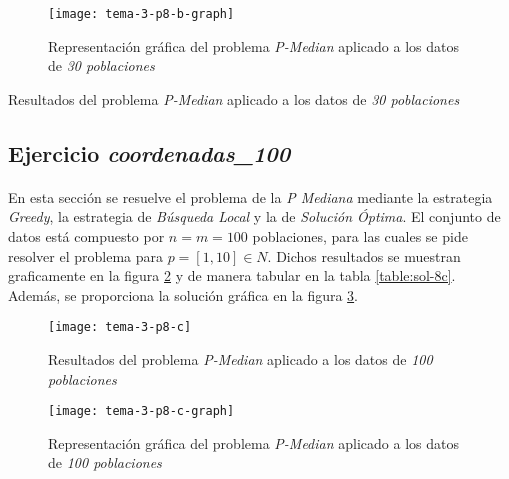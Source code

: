 \documentclass[spanish]{article}
\begin{document}
			\begin{figure}[h]
				\begin{center}
					\texttt{[image: tema-3-p8-b-graph]}
				\end{center}
				\caption{Representación gráfica del problema \emph{P-Median} aplicado a los datos de \emph{30 poblaciones}}
				\label{fig:sol-8b-graph}
			\end{figure}

			\begin{table}[h]
				\begin{center}
				\end{center}
				\caption{Resultados del problema \emph{P-Median} aplicado a los datos de \emph{30 poblaciones}}
				\label{table:sol-8b}
			\end{table}

		\subsection{Ejercicio \emph{coordenadas\_100}}
		\label{sec:e-8c}

			\paragraph{}
			En esta sección se resuelve el problema de la \emph{P Mediana} mediante la estrategia \emph{Greedy}, la estrategia de \emph{Búsqueda Local} y la de \emph{Solución Óptima}. El conjunto de datos está compuesto por $n = m = 100$ poblaciones, para las cuales se pide resolver el problema para $p = [1,10] \in N$. Dichos resultados se muestran graficamente en la figura \ref{fig:sol-8c} y de manera tabular en la tabla \ref{table:sol-8c}. Además, se proporciona la solución gráfica en la figura \ref{fig:sol-8c-graph}.


			\begin{figure}[h]
				\begin{center}
					\texttt{[image: tema-3-p8-c]}
				\end{center}
				\caption{Resultados del problema \emph{P-Median} aplicado a los datos de \emph{100 poblaciones}}
				\label{fig:sol-8c}
			\end{figure}

			\begin{figure}[h]
				\begin{center}
					\texttt{[image: tema-3-p8-c-graph]}
				\end{center}
				\caption{Representación gráfica del problema \emph{P-Median} aplicado a los datos de \emph{100 poblaciones}}
				\label{fig:sol-8c-graph}
			\end{figure}
\end{document}
